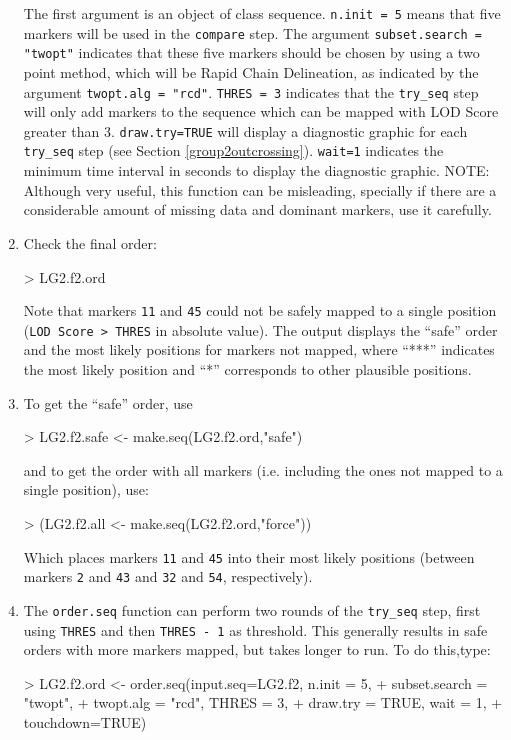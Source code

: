 \documentclass[letterpaper,12pt,oneside]{article}
\begin{document}
\begin{enumerate}
The first argument is an object of class sequence. {\tt n.init = 5} means that five markers will be used in the {\tt compare} step. The argument {\tt subset.search = "twopt"} indicates that these five markers should be chosen by using a two point method, which will be Rapid Chain Delineation, as indicated by the argument {\tt twopt.alg = "rcd"}. {\tt THRES = 3} indicates that the {\tt try_seq} step will only add markers to the sequence which can be mapped with LOD Score greater than 3. {\tt draw.try=TRUE} will display a diagnostic graphic for each {\tt try_seq} step (see Section \ref{group2outcrossing}). {\tt wait=1} indicates the minimum time interval in seconds to display the diagnostic graphic. 
NOTE: Although very useful, this function can be misleading, specially if there are a considerable amount of missing data and dominant markers, use it carefully. 

\item Check the final order:
\begin{Schunk}
\begin{Sinput}
> LG2.f2.ord
\end{Sinput}
\end{Schunk}
Note that markers {\tt 11} and {\tt 45} could not be safely mapped to a single position ({\tt LOD Score > THRES} in absolute value). The output displays the ``safe'' order and the most likely positions for markers not mapped, where ``***'' indicates the most likely position and ``*'' corresponds to other plausible positions.

\item To get the ``safe'' order, use
\begin{Schunk}
\begin{Sinput}
> LG2.f2.safe <- make.seq(LG2.f2.ord,"safe")
\end{Sinput}
\end{Schunk}
and to get the order with all markers (i.e. including the ones not mapped to a single position), use: 
\begin{Schunk}
\begin{Sinput}
> (LG2.f2.all <- make.seq(LG2.f2.ord,"force"))
\end{Sinput}
\end{Schunk}

Which places markers {\tt 11} and {\tt 45} into their most likely positions (between markers {\tt 2} and {\tt 43} and {\tt 32} and {\tt 54}, respectively). 

\item The {\tt order.seq} function can perform two rounds of the {\tt try_seq} step, first using {\tt THRES} and then {\tt THRES - 1} as threshold. This generally results in safe orders with more markers mapped, but takes longer to run. To do this,type:
\begin{Schunk}
\begin{Sinput}
> LG2.f2.ord <- order.seq(input.seq=LG2.f2, n.init = 5, 
+                         subset.search = "twopt", 
+                         twopt.alg = "rcd", THRES = 3, 
+                         draw.try = TRUE, wait = 1,
+                         touchdown=TRUE)
\end{Sinput}
\end{Schunk}


\end{enumerate}
\end{document}
